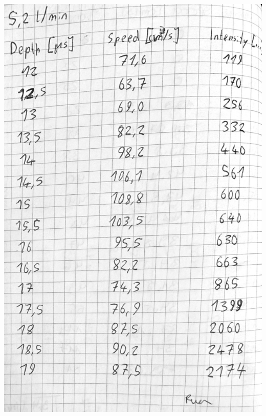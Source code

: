 \vfill\null
\newpage
\null\vfill
\includegraphics[width=0.666\linewidth]{content/messung/4.jpg}
\vfill\null


